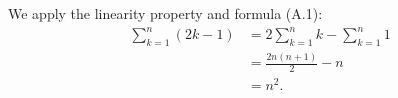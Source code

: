\exercise
We apply the linearity property and formula (A.1):
\begin{align*}
    \sum_{k=1}^n(2k-1) &= 2\sum_{k=1}^n k - \sum_{k=1}^n 1 \\
    &= \frac{2n(n+1)}{2} - n \\
    &= n^2.
\end{align*}
